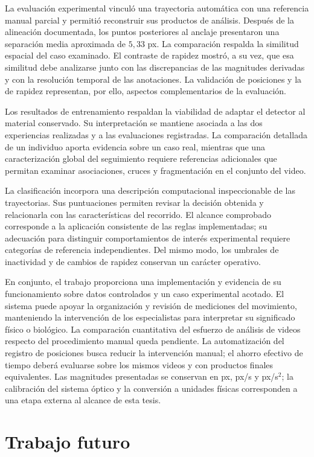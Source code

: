 La evaluación experimental vinculó una trayectoria automática con una referencia manual parcial y permitió reconstruir sus productos de análisis. Después de la alineación documentada, los puntos posteriores al anclaje presentaron una separación media aproximada de $5{,}33$ px. La comparación respalda la similitud espacial del caso examinado. El contraste de rapidez mostró, a su vez, que esa similitud debe analizarse junto con las discrepancias de las magnitudes derivadas y con la resolución temporal de las anotaciones. La validación de posiciones y la de rapidez representan, por ello, aspectos complementarios de la evaluación.

Los resultados de entrenamiento respaldan la viabilidad de adaptar el detector al material conservado. Su interpretación se mantiene asociada a las dos experiencias realizadas y a las evaluaciones registradas. La comparación detallada de un individuo aporta evidencia sobre un caso real, mientras que una caracterización global del seguimiento requiere referencias adicionales que permitan examinar asociaciones, cruces y fragmentación en el conjunto del video.

La clasificación incorpora una descripción computacional inspeccionable de las trayectorias. Sus puntuaciones permiten revisar la decisión obtenida y relacionarla con las características del recorrido. El alcance comprobado corresponde a la aplicación consistente de las reglas implementadas; su adecuación para distinguir comportamientos de interés experimental requiere categorías de referencia independientes. Del mismo modo, los umbrales de inactividad y de cambios de rapidez conservan un carácter operativo.

En conjunto, el trabajo proporciona una implementación y evidencia de su funcionamiento sobre datos controlados y un caso experimental acotado. El sistema puede apoyar la organización y revisión de mediciones del movimiento, manteniendo la intervención de los especialistas para interpretar su significado físico o biológico. La comparación cuantitativa del esfuerzo de análisis de videos respecto del procedimiento manual queda pendiente. La automatización del registro de posiciones busca reducir la intervención manual; el ahorro efectivo de tiempo deberá evaluarse sobre los mismos videos y con productos finales equivalentes. Las magnitudes presentadas se conservan en px, px/s y px/s$^2$; la calibración del sistema óptico y la conversión a unidades físicas corresponden a una etapa externa al alcance de esta tesis.

\section{Trabajo futuro}

